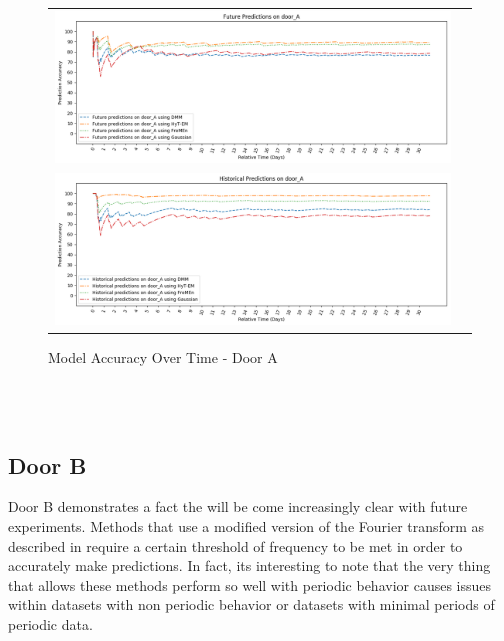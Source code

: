 \begin{center}
\begin{figure}[!Hp]
  \begin{tabular}{cc}
    {\includegraphics[width = 6in]{images/results/Future_Predictions_on_door_A.png}} \\
    {\includegraphics[width = 6in]{images/results/Historical_Predictions_on_door_A.png}} \\
  \end{tabular}
  \caption{Model Accuracy Over Time - Door A}
  \label{figure:accuracy_door_A}
\end{figure} \\ \\
\end{center}

\subsection { Door B }

Door B demonstrates a fact the will be come increasingly clear with future
experiments. Methods that use a modified version of the Fourier transform as
described in \cite{Krajnik2015} require a certain threshold of frequency to be met
in order to accurately make predictions. In fact, its interesting to note that the
very thing that allows these methods perform so well with periodic behavior
causes issues within datasets with non periodic behavior or datasets with
minimal periods of periodic data. \\

